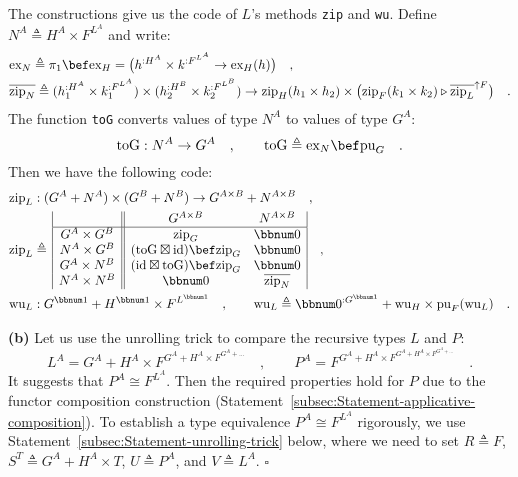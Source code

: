 The constructions give us the code of $L$\textsf{'}s methods \lstinline!zip!
and \lstinline!wu!. Define $N^{A}\triangleq H^{A}\times F^{L^{A}}$
and write: 
\begin{align*}
 & \text{ex}_{N}\triangleq\pi_{1}\bef\text{ex}_{H}=\big(h^{:H^{A}}\times k^{:F^{L^{A}}}\rightarrow\text{ex}_{H}(h)\big)\quad,\\
 & \overline{\text{zip}_{N}}\triangleq(h_{1}^{:H^{A}}\times k_{1}^{:F^{L^{A}}})\times(h_{2}^{:H^{B}}\times k_{2}^{:F^{L^{B}}})\rightarrow\text{zip}_{H}(h_{1}\times h_{2})\times\big(\text{zip}_{F}(k_{1}\times k_{2})\triangleright\overline{\text{zip}_{L}}^{\uparrow F}\big)\quad.
\end{align*}
The function \lstinline!toG! converts values of type $N^{A}$ to
values of type $G^{A}$:
\[
\text{toG}:N^{A}\rightarrow G^{A}\quad,\quad\quad\text{toG}\triangleq\text{ex}_{N}\bef\text{pu}_{G}\quad.
\]
Then we have the following code:
\begin{align*}
 & \text{zip}_{L}:(G^{A}+N^{A})\times(G^{B}+N^{B})\rightarrow G^{A\times B}+N^{A\times B}\quad,\\
 & \text{zip}_{L}\triangleq\,\begin{array}{|c||cc|}
 & G^{A\times B} & N^{A\times B}\\
\hline G^{A}\times G^{B} & \text{zip}_{G} & \bbnum 0\\
N^{A}\times G^{B} & (\text{toG}\boxtimes\text{id})\bef\text{zip}_{G} & \bbnum 0\\
G^{A}\times N^{B} & (\text{id}\boxtimes\text{toG})\bef\text{zip}_{G} & \bbnum 0\\
N^{A}\times N^{B} & \bbnum 0 & \overline{\text{zip}_{N}}
\end{array}\quad,\\
 & \text{wu}_{L}:G^{\bbnum 1}+H^{\bbnum 1}\times F^{L^{\bbnum 1}}\quad,\quad\quad\text{wu}_{L}\triangleq\bbnum 0^{:G^{\bbnum 1}}+\text{wu}_{H}\times\text{pu}_{F}(\text{wu}_{L})\quad.
\end{align*}

\textbf{(b)} Let us use the unrolling
trick to compare the recursive types $L$ and $P$:
\[
L^{A}=G^{A}+H^{A}\times F^{G^{A}+H^{A}\times F^{G^{A}+...}}\quad,\quad\quad P^{A}=F^{G^{A}+H^{A}\times F^{G^{A}+H^{A}\times F^{G^{A}+...}}}\quad.
\]
It suggests that $P^{A}\cong F^{L^{A}}$. Then the required properties
hold for $P$ due to the functor composition construction (Statement~\ref{subsec:Statement-applicative-composition}).
To establish a type equivalence $P^{A}\cong F^{L^{A}}$ rigorously,
we use Statement~\ref{subsec:Statement-unrolling-trick} below, where
we need to set $R\triangleq F$, $S^{T}\triangleq G^{A}+H^{A}\times T$,
$U\triangleq P^{A}$, and $V\triangleq L^{A}$. $\square$

